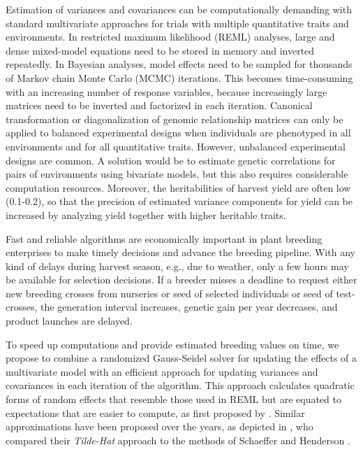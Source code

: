 \documentclass{bmcart}
\begin{document}
Estimation of variances and covariances can be computationally demanding with standard multivariate approaches for trials with multiple quantitative traits and environments. In restricted maximum likelihood (REML) analyses, large and dense mixed-model equations need to be stored in memory and inverted repeatedly. In Bayesian analyses, model effects need to be sampled for thousands of Markov chain Monte Carlo (MCMC) iterations. This becomes time-consuming with an increasing number of response variables, because increasingly large matrices need to be inverted and factorized in each iteration. Canonical transformation \cite{Meyer1985} or diagonalization of genomic relationship matrices \cite{TS1990} can only be applied to balanced experimental designs when individuals are phenotyped in all environments and for all quantitative traits. However, unbalanced experimental designs are common. A solution would be to estimate genetic correlations for pairs of environments using bivariate models, but this also requires considerable  computation resources. Moreover, the heritabilities of harvest yield are often low (0.1-0.2), so that the precision of estimated variance components for yield can be increased by analyzing yield together with higher heritable traits.

Fast and reliable algorithms are economically important in plant breeding enterprises to make timely decisions and advance the breeding pipeline. With any kind of delays during harvest season, e.g., due to weather, only a few hours may be available for selection decisions. If a breeder misses a deadline to request either new breeding crosses from nurseries or seed of selected individuals or seed of test-crosses, the generation interval increases, genetic gain per year decreases, and product launches are delayed. 

To speed up computations and provide estimated breeding values on time, we propose to combine a randomized Gauss-Seidel \cite{LL2010,Ma2015} solver for updating the effects of a multivariate model with an efficient approach for updating variances and covariances in each iteration of the algorithm. This approach calculates quadratic forms of random effects that resemble those used in REML but are equated to expectations that are easier to compute, as first proposed by \cite{CunninghamHenderson1968, Thompson1969}. Similar approximations have been proposed over the years, as depicted in \cite{VanRaden}, who compared their \textsl{Tilde-Hat} approach to the methods of Schaeffer \cite{Schaeffer} and Henderson \cite{Henderson1980}.
\end{document}
